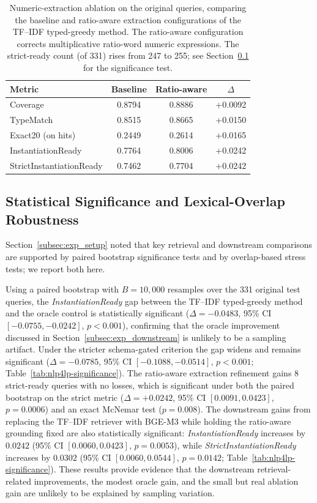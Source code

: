\documentclass[3p]{elsarticle}
\begin{document}
\begin{table}[t]
  \centering
  \caption{Numeric-extraction ablation on the original queries, comparing the baseline and ratio-aware extraction configurations of the TF--IDF typed-greedy method. The ratio-aware configuration corrects multiplicative ratio-word numeric expressions. The strict-ready count (of 331) rises from 247 to 255; see Section~\ref{subsec:exp_significance} for the significance test.}
  \label{tab:nlp4lp-prefix-postfix}
  \small
  \setlength{\tabcolsep}{4pt}
  \begin{tabular}{lccc}
    \toprule
    Metric & Baseline & Ratio-aware & $\Delta$ \\
    \midrule
    Coverage & 0.8794 & 0.8886 & +0.0092 \\
    TypeMatch & 0.8515 & 0.8665 & +0.0150 \\
    Exact20 (on hits) & 0.2449 & 0.2614 & +0.0165 \\
    InstantiationReady & 0.7764 & 0.8006 & +0.0242 \\
    StrictInstantiationReady & 0.7462 & 0.7704 & +0.0242 \\
    \bottomrule
  \end{tabular}
\end{table}

\subsection{Statistical Significance and Lexical-Overlap Robustness}
\label{subsec:exp_significance}

Section~\ref{subsec:exp_setup} noted that key retrieval and downstream comparisons are supported by paired bootstrap significance tests and by overlap-based stress tests; we report both here.

Using a paired bootstrap with $B=10{,}000$ resamples over the 331 original test queries, the \textit{InstantiationReady} gap between the TF--IDF typed-greedy method and the oracle control is statistically significant ($\Delta=-0.0483$, 95\% CI $[-0.0755,-0.0242]$, $p<0.001$), confirming that the oracle improvement discussed in Section~\ref{subsec:exp_downstream} is unlikely to be a sampling artifact. Under the stricter schema-gated criterion the gap widens and remains significant ($\Delta=-0.0785$, 95\% CI $[-0.1088,-0.0514]$, $p<0.001$; Table~\ref{tab:nlp4lp-significance}). The ratio-aware extraction refinement gains 8 strict-ready queries with no losses, which is significant under both the paired bootstrap on the strict metric ($\Delta=+0.0242$, 95\% CI $[0.0091,0.0423]$, $p=0.0006$) and an exact McNemar test ($p=0.008$). The downstream gains from replacing the TF--IDF retriever with BGE-M3 while holding the ratio-aware grounding fixed are also statistically significant: \textit{InstantiationReady} increases by $0.0242$ (95\% CI $[0.0060, 0.0423]$, $p=0.0053$), while \textit{StrictInstantiationReady} increases by $0.0302$ (95\% CI $[0.0060, 0.0544]$, $p=0.0142$; Table~\ref{tab:nlp4lp-significance}). These results provide evidence that the downstream retrieval-related improvements, the modest oracle gain, and the small but real ablation gain are unlikely to be explained by sampling variation.
\end{document}
